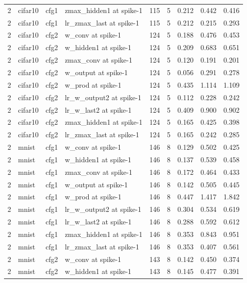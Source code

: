 \begin{table}[htbp]
{\begin{tabular}{@{}rlllrrrrr@{}}
2 & cifar10 & cfg1 & zmax\_hidden1 at spike-1 & 115 & 5 & 0.212 & 0.442 & 0.416 \\
2 & cifar10 & cfg1 & lr\_zmax\_last at spike-1 & 115 & 5 & 0.212 & 0.215 & 0.293 \\
2 & cifar10 & cfg2 & w\_conv at spike-1 & 124 & 5 & 0.188 & 0.476 & 0.453 \\
2 & cifar10 & cfg2 & w\_hidden1 at spike-1 & 124 & 5 & 0.209 & 0.683 & 0.651 \\
2 & cifar10 & cfg2 & zmax\_conv at spike-1 & 124 & 5 & 0.120 & 0.191 & 0.201 \\
2 & cifar10 & cfg2 & w\_output at spike-1 & 124 & 5 & 0.056 & 0.291 & 0.278 \\
2 & cifar10 & cfg2 & w\_prod at spike-1 & 124 & 5 & 0.435 & 1.114 & 1.109 \\
2 & cifar10 & cfg2 & lr\_w\_output2 at spike-1 & 124 & 5 & 0.112 & 0.228 & 0.242 \\
2 & cifar10 & cfg2 & lr\_w\_last2 at spike-1 & 124 & 5 & 0.409 & 0.900 & 0.902 \\
2 & cifar10 & cfg2 & zmax\_hidden1 at spike-1 & 124 & 5 & 0.165 & 0.425 & 0.398 \\
2 & cifar10 & cfg2 & lr\_zmax\_last at spike-1 & 124 & 5 & 0.165 & 0.242 & 0.285 \\
2 & mnist & cfg1 & w\_conv at spike-1 & 146 & 8 & 0.129 & 0.502 & 0.425 \\
2 & mnist & cfg1 & w\_hidden1 at spike-1 & 146 & 8 & 0.137 & 0.539 & 0.458 \\
2 & mnist & cfg1 & zmax\_conv at spike-1 & 146 & 8 & 0.172 & 0.464 & 0.433 \\
2 & mnist & cfg1 & w\_output at spike-1 & 146 & 8 & 0.142 & 0.505 & 0.445 \\
2 & mnist & cfg1 & w\_prod at spike-1 & 146 & 8 & 0.447 & 1.417 & 1.842 \\
2 & mnist & cfg1 & lr\_w\_output2 at spike-1 & 146 & 8 & 0.304 & 0.534 & 0.619 \\
2 & mnist & cfg1 & lr\_w\_last2 at spike-1 & 146 & 8 & 0.288 & 0.592 & 0.612 \\
2 & mnist & cfg1 & zmax\_hidden1 at spike-1 & 146 & 8 & 0.353 & 0.843 & 0.951 \\
2 & mnist & cfg1 & lr\_zmax\_last at spike-1 & 146 & 8 & 0.353 & 0.407 & 0.561 \\
2 & mnist & cfg2 & w\_conv at spike-1 & 143 & 8 & 0.142 & 0.450 & 0.374 \\
2 & mnist & cfg2 & w\_hidden1 at spike-1 & 143 & 8 & 0.145 & 0.477 & 0.391 \\

\end{tabular}}
\end{table}

